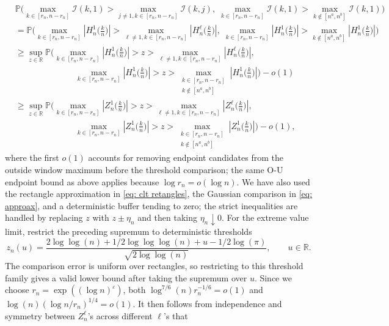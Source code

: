 \documentclass[10pt]{article}
\def\P{\mathbb{P}}
\def\reals{\mathbb{R}}
\def\I{\mathscr{I}}
\theoremstyle{definition}
\theoremstyle{remark}
\begin{document}
\begin{align*}
    & \mathbb{P}\Big(\max_{k \in [r_n, n - r_n]}\I(k,1) > \max_{j\neq 1, k \in [r_n, n - r_n]}\I(k,j), \; \max_{k \in [r_n, n - r_n]}\I(k,1) > \max_{k \notin [n^a,n^b]}\I(k,1) \Big) \\
    & = \P \Big(\max_{k \in [r_n, n - r_n]} |H_n^1\Big(\frac{k}{n}\Big)| > \max_{\ell \neq 1, k \in [r_n, n - r_n]}|H_n^\ell\Big(\frac{k}{n}\Big)|, \; \max_{k \in [r_n, n - r_n]} |H_n^1\Big(\frac{k}{n}\Big)| > \max_{k \notin [n^a,n^b]} |H_n^1\Big(\frac{k}{n}\Big)| \Big) \\
    & \geq \sup_{z \in \reals}\P \Big(\max_{k \in [r_n, n - r_n]} |H_n^1\Big(\frac{k}{n}\Big)| > z > \max_{\ell \neq 1, k \in [r_n, n - r_n]}|H_n^\ell\Big(\frac{k}{n}\Big)|, \\
    & \qquad\qquad\qquad\quad \max_{k \in [r_n, n - r_n]} |H_n^1\Big(\frac{k}{n}\Big)| > z > \max_{\substack{k \in [r_n,n-r_n]\\ k \notin [n^a,n^b]}} |H_n^1\Big(\frac{k}{n}\Big)| \Big) - o(1) \\
    & \geq \sup_{z \in \reals}\P \Big(\max_{k \in [r_n, n - r_n]} |Z_n^1\Big(\frac{k}{n}\Big)| > z > \max_{\ell \neq 1, k \in [r_n, n - r_n]}|Z_n^\ell\Big(\frac{k}{n}\Big)|, \\
    & \qquad\qquad\qquad\quad \max_{k \in [r_n, n - r_n]} |Z_n^1\Big(\frac{k}{n}\Big)| > z > \max_{\substack{k \in [r_n,n-r_n]\\ k \notin [n^a,n^b]}} |Z_n^1\Big(\frac{k}{n}\Big)| \Big) - o(1),
\end{align*}
where the first $o(1)$ accounts for removing endpoint candidates from the outside window maximum before the threshold comparison; the same O-U endpoint bound as above applies because $\log r_n=o(\log n)$. We have also used the rectangle approximation in \eqref{eq: clt retangles}, the Gaussian comparison in \eqref{eq: approax}, and a deterministic buffer tending to zero; the strict inequalities are handled by replacing $z$ with $z\pm\eta_n$ and then taking $\eta_n\downarrow0$. For the extreme value limit, restrict the preceding supremum to deterministic thresholds
\[
    z_n(u)=\frac{2 \log \log (n) + 1/2 \log \log \log (n) + u - 1/2 \log(\pi)}{\sqrt{2 \log \log (n)}},
    \qquad u\in\reals .
\]
The comparison error is uniform over rectangles, so restricting to this threshold family gives a valid lower bound after taking the supremum over $u$. Since we choose $r_n = \exp((\log n)^{\varepsilon})$, both $\log^{7/6}(n) r_n^{-1/6}=o(1)$ and $\log(n)(\log n/r_n)^{1/4}=o(1)$. It then follows from independence and symmetry between $Z_n^\ell$'s across different $\ell$'s that
\end{document}
